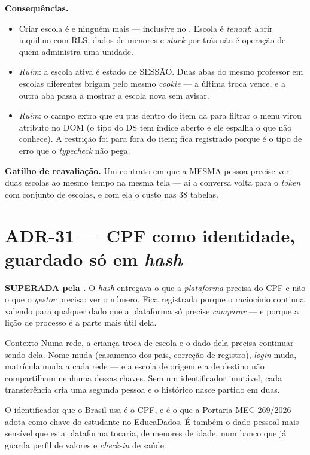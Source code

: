 \textbf{Consequências.}
\begin{itemize}
  \item Criar escola é  e ninguém mais --- inclusive no
    . Escola é \emph{tenant}: abrir inquilino com RLS, dados de
    menores e \emph{stack} por trás não é operação de quem administra uma unidade.
  \item \emph{Ruim}: a escola ativa é estado de SESSÃO. Duas abas do mesmo
    professor em escolas diferentes brigam pelo mesmo \emph{cookie} --- a última
    troca vence, e a outra aba passa a mostrar a escola nova sem avisar.
  \item \emph{Ruim}: o campo extra que eu pus dentro do item da  para
    filtrar o menu virou atributo no DOM (o tipo do DS tem índice aberto e ele
    espalha o que não conhece). A restrição foi para fora do item; fica
    registrado porque é o tipo de erro que o \emph{typecheck} não pega.
\end{itemize}

\textbf{Gatilho de reavaliação.} Um contrato em que a MESMA pessoa precise ver
duas escolas ao mesmo tempo na mesma tela --- aí a conversa volta para o
\emph{token} com conjunto de escolas, e com ela o custo nas 38 tabelas.

\section{ADR-31 --- CPF como identidade, guardado só em \emph{hash}}
\label{adr:cpf}

\begin{atencao}
\textbf{SUPERADA pela .} O \emph{hash} entregava o que a
\emph{plataforma} precisa do CPF e não o que o \emph{gestor} precisa: ver o
número. Fica registrada porque o raciocínio continua valendo para qualquer dado
que a plataforma só precise \emph{comparar} --- e porque a lição de processo é a
parte mais útil dela.
\end{atencao}

\begin{especificacao}{Contexto}
Numa rede, a criança troca de escola e o dado dela precisa continuar sendo dela.
Nome muda (casamento dos pais, correção de registro), \emph{login} muda,
matrícula muda a cada rede --- e a escola de origem e a de destino não
compartilham nenhuma dessas chaves. Sem um identificador imutável, cada
transferência cria uma segunda pessoa e o histórico nasce partido em duas.

O identificador que o Brasil usa é o CPF, e é o que a Portaria MEC 269/2026
adota como chave do estudante no EducaDados. É também o dado pessoal mais
sensível que esta plataforma tocaria, de menores de idade, num banco que já
guarda perfil de valores e \emph{check-in} de saúde.
\end{especificacao}

